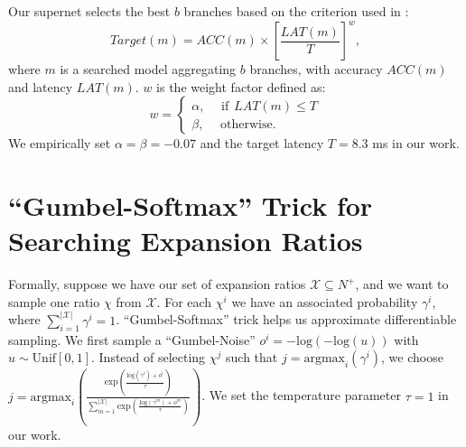 \documentclass{article} \usepackage{iclr2020_conference,times}
\begin{document}
Our supernet selects the best $b$ branches based on the criterion used in \citep{tan2019mnasnet}:
\begin{equation}
    Target(m) = ACC(m) \times [\frac{LAT(m)}{T}]^w,
\end{equation}
where $m$ is a searched model aggregating $b$ branches, with accuracy $ACC(m)$ and latency $LAT(m)$. $w$ is the weight factor defined as:
\begin{equation}
w = 
\begin{cases}
    \alpha, \hspace{15pt} \mathrm{ if } \hspace{5pt} LAT(m) \leq T \\
    \beta, \hspace{15pt} \mathrm{ otherwise}.
\end{cases}
\end{equation}
We empirically set $\alpha = \beta = -0.07$ and the target latency $T = 8.3$ ms in our work.

\section{``Gumbel-Softmax'' Trick for Searching Expansion Ratios} \vspace{-0.7em} \label{app:expansion_ratio}
Formally, suppose we have our set of expansion ratios $\mathcal{X} \subseteq N^+$, and we want to sample one ratio $\chi$ from $\mathcal{X}$. For each $\chi^i$ we have an associated probability $\gamma^i$, where $\sum_{i=1}^{|\mathcal{X}|} \gamma^i = 1$. ``Gumbel-Softmax'' trick \citep{gumbel1954statistical,maddison2014sampling} helps us approximate differentiable sampling. We first sample a ``Gumbel-Noise'' $o^i = -\mathrm{log}(-\mathrm{log}(u))$ with $u \sim \mathrm{Unif}[0, 1]$. Instead of selecting $\chi^j$ such that $j = \mathrm{argmax}_i(\gamma^i)$, we choose $j = \mathrm{argmax}_i(\frac{\mathrm{exp}(\frac{\mathrm{log}(\gamma^i)+o^i}{\tau})}{\sum_{m=1}^{|\mathcal{X}|}\mathrm{exp}(\frac{\mathrm{log}(\gamma^m)+o^m}{\tau})})$. We set the temperature parameter $\tau = 1$ in our work. 
\end{document}

